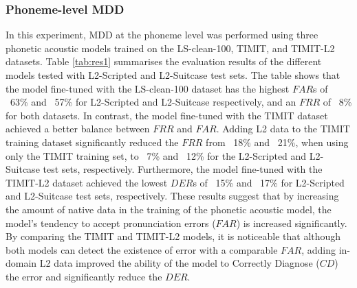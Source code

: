 \documentclass[12pt]{elsarticle}
\begin{document}
\subsubsection{Phoneme-level MDD}
In this experiment, MDD at the phoneme level was performed using three phonetic acoustic models trained on the LS-clean-100, TIMIT, and TIMIT-L2 datasets. Table \ref{tab:res1} summarises the evaluation results of the different models tested with L2-Scripted and L2-Suitcase test sets. The table shows that the model fine-tuned with the LS-clean-100 dataset has the highest $FAR$s of ~63\% and ~57\% for L2-Scripted and L2-Suitcase respectively, and an $FRR$ of ~8\% for both datasets. In contrast, the model fine-tuned with the TIMIT dataset achieved a better balance between $FRR$ and $FAR$. Adding L2 data to the TIMIT training dataset significantly reduced the $FRR$ from ~18\% and ~21\%, when using only the TIMIT training set, to ~7\% and ~12\% for the L2-Scripted and L2-Suitcase test sets, respectively. Furthermore, the model fine-tuned with the TIMIT-L2 dataset achieved the lowest $DER$s of ~15\% and ~17\% for L2-Scripted and L2-Suitcase test sets, respectively. These results suggest that by increasing the amount of native data in the training of the phonetic acoustic model, the model’s tendency to accept pronunciation errors ($FAR$) is increased significantly. By comparing the TIMIT and TIMIT-L2 models, it is noticeable that although both models can detect the existence of error with a comparable $FAR$, adding in-domain L2 data improved the ability of the model to Correctly Diagnose ($CD$) the error and significantly reduce the $DER$.
\end{document}
